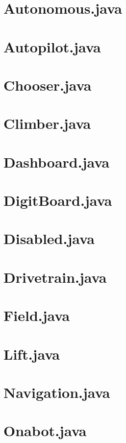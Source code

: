 \newpage\section*{Autonomous.java}
\newpage\section*{Autopilot.java}
\newpage\section*{Chooser.java}
\newpage\section*{Climber.java}
\newpage\section*{Dashboard.java}
\newpage\section*{DigitBoard.java}
\newpage\section*{Disabled.java}
\newpage\section*{Drivetrain.java}
\newpage\section*{Field.java}
\newpage\section*{Lift.java}
\newpage\section*{Navigation.java}
\newpage\section*{Onabot.java}
